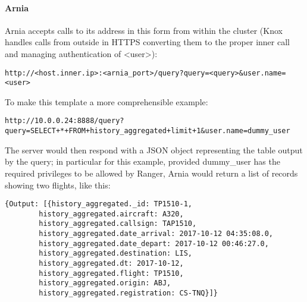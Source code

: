 \paragraph{Arnia}

Arnia accepts calls to its address in this form from within the cluster (Knox handles calls from outside in HTTPS converting them to the proper inner call and managing authentication of <user>): 

\begin{code}
	\begin{verbatim}
http://<host.inner.ip>:<arnia_port>/query?query=<query>&user.name=<user>
	\end{verbatim}
\end{code}

To make this template a more comprehensible example:

\begin{code}
	\begin{verbatim}
http://10.0.0.24:8888/query?query=SELECT+*+FROM+history_aggregated+limit+1&user.name=dummy_user
	\end{verbatim}
\end{code}

The server would then respond with a JSON object representing the table output by the query; in particular for this example, provided dummy\_user has the required privileges to be allowed by Ranger, Arnia would return a list of records showing two flights, like this:
\\
\begin{code}
	\begin{verbatim}
{Output: [{history_aggregated._id: TP1510-1, 
        history_aggregated.aircraft: A320, 
        history_aggregated.callsign: TAP1510, 
        history_aggregated.date_arrival: 2017-10-12 04:35:08.0, 
        history_aggregated.date_depart: 2017-10-12 00:46:27.0, 
        history_aggregated.destination: LIS, 
        history_aggregated.dt: 2017-10-12, 
        history_aggregated.flight: TP1510, 
        history_aggregated.origin: ABJ, 
        history_aggregated.registration: CS-TNQ}]}
	\end{verbatim}
\end{code}

